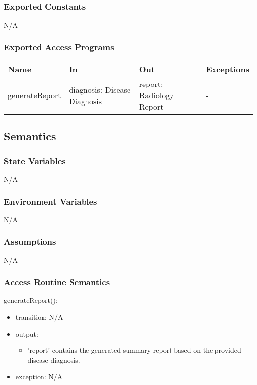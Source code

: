 \documentclass[12pt, titlepage]{article}
\begin{document}
\subsubsection{Exported Constants}
N/A

\subsubsection{Exported Access Programs}

\begin{center}
    \begin{tabular}{p{3cm} p{3.5cm} p{5cm} p{3cm}}
    \hline
    \textbf{Name} & \textbf{In} & \textbf{Out} & \textbf{Exceptions} \\
    \hline
    generateReport & diagnosis: Disease Diagnosis & report: Radiology Report & - \\
    \hline
    \end{tabular}
\end{center}

\subsection{Semantics}

\subsubsection{State Variables}
N/A

\subsubsection{Environment Variables}
N/A

\subsubsection{Assumptions}
N/A

\subsubsection{Access Routine Semantics}

\noindent generateReport():
\begin{itemize}
\item transition: N/A 
\item output: \begin{itemize}
    \item 'report' contains the generated summary report based on the provided disease diagnosis.
\end{itemize}
\item exception: N/A
\end{itemize}
\end{document}
